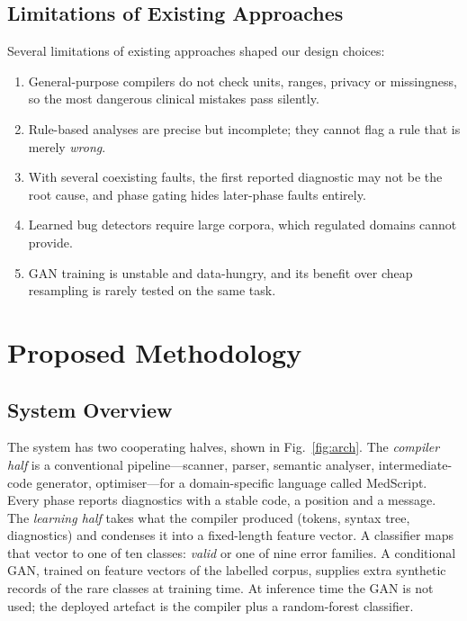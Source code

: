 \documentclass[conference]{IEEEtran}
\begin{document}
\subsection{Limitations of Existing Approaches}

Several limitations of existing approaches shaped our design choices:

\begin{enumerate}
    \item General-purpose compilers do not check units, ranges, privacy or missingness, so the most dangerous
    clinical mistakes pass silently.
    \item Rule-based analyses are precise but incomplete; they cannot flag a rule that is merely \emph{wrong}.
    \item With several coexisting faults, the first reported diagnostic may not be the root cause, and phase gating hides
    later-phase faults entirely.
    \item Learned bug detectors require large corpora, which regulated domains cannot provide.
    \item GAN training is unstable and data-hungry, and its benefit over cheap resampling is rarely tested on the same
    task.
\end{enumerate}


\section{Proposed Methodology}\label{sec:method}

\subsection{System Overview}

The system has two cooperating halves, shown in Fig.~\ref{fig:arch}. The \emph{compiler half} is a conventional
pipeline---scanner, parser, semantic analyser, intermediate-code generator, optimiser---for a domain-specific
language called MedScript. Every phase reports diagnostics with a stable code, a position and a message. The
\emph{learning half} takes what the compiler produced (tokens, syntax tree, diagnostics) and condenses it into a
fixed-length feature vector. A classifier maps that vector to one of ten classes: \emph{valid} or one of nine error
families. A conditional GAN, trained on feature vectors of the labelled corpus, supplies extra synthetic records of
the rare classes at training time. At inference time the GAN is not used; the deployed artefact is the compiler plus
a random-forest classifier.
\end{document}
